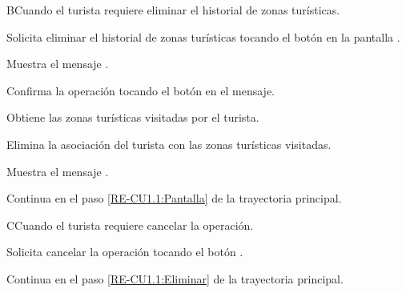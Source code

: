 	\begin{UCtrayectoriaA}{B}{Cuando el turista requiere eliminar el historial de zonas turísticas.}
		
		\UCpaso [\UCactor] \label{RE-CU1.1:Eliminar} Solicita eliminar el historial de zonas turísticas tocando el botón  en la pantalla .
		
		\UCpaso Muestra el mensaje .
		
		\UCpaso [\UCactor] Confirma la operación tocando el botón  en el mensaje. 
		
		\UCpaso Obtiene las zonas turísticas visitadas por el turista.
		
		\UCpaso Elimina la asociación del turista con las zonas turísticas visitadas. 
		
		\UCpaso Muestra el mensaje .
		
		\UCpaso Continua en el paso \ref{RE-CU1.1:Pantalla} de la trayectoria principal.
		
	\end{UCtrayectoriaA}
	
	\begin{UCtrayectoriaA}{C}{Cuando el turista requiere cancelar la operación.}
		
		\UCpaso [\UCactor] Solicita cancelar la operación tocando el botón .
		
		\UCpaso Continua en el paso \ref{RE-CU1.1:Eliminar} de la trayectoria principal.
		
	\end{UCtrayectoriaA}